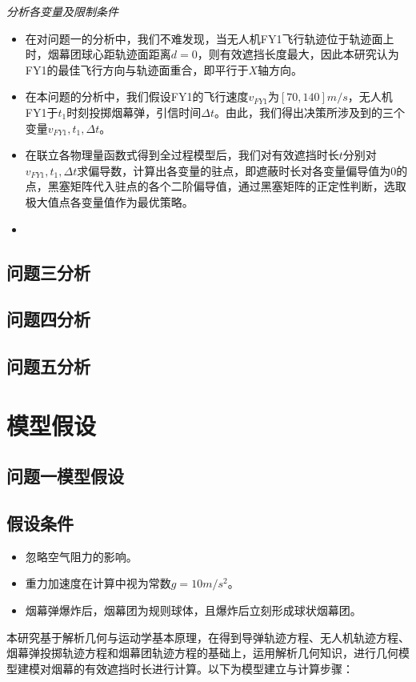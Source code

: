 \documentclass{article}
\begin{document}
\textit{分析各变量及限制条件}
\begin{itemize}
    \item 在对问题一的分析中，我们不难发现，当无人机FY1飞行轨迹位于轨迹面上时，烟幕团球心距轨迹面距离$d=0$，则有效遮挡长度最大，因此本研究认为FY1的最佳飞行方向与轨迹面重合，即平行于$X$轴方向。
    \item 在本问题的分析中，我们假设FY1的飞行速度$v_{FY1}$为$[70,140]m/s$，无人机FY1于$t_1$时刻投掷烟幕弹，引信时间$\Delta t$。由此，我们得出决策所涉及到的三个变量$v_{FY1},t_1,\Delta t$。
    \item 在联立各物理量函数式得到全过程模型后，我们对有效遮挡时长$t$分别对$v_{FY1},t_1,\Delta t$求偏导数，计算出各变量的驻点，即遮蔽时长对各变量偏导值为0的点，黑塞矩阵代入驻点的各个二阶偏导值，通过黑塞矩阵的正定性判断，选取极大值点各变量值作为最优策略。
    \item 
\end{itemize}

\subsection{问题三分析}

\subsection{问题四分析}

\subsection{问题五分析}

\section{模型假设}

\subsection{问题一模型假设}
\subsection{假设条件}
\begin{itemize}
    \item 忽略空气阻力的影响。
    \item 重力加速度在计算中视为常数$g = 10m/s^2$。
    \item 烟幕弹爆炸后，烟幕团为规则球体，且爆炸后立刻形成球状烟幕团。
\end{itemize}
本研究基于解析几何与运动学基本原理，在得到导弹轨迹方程、无人机轨迹方程、烟幕弹投掷轨迹方程和烟幕团轨迹方程的基础上，运用解析几何知识，进行几何模型建模对烟幕的有效遮挡时长进行计算。以下为模型建立与计算步骤：
\end{document}
